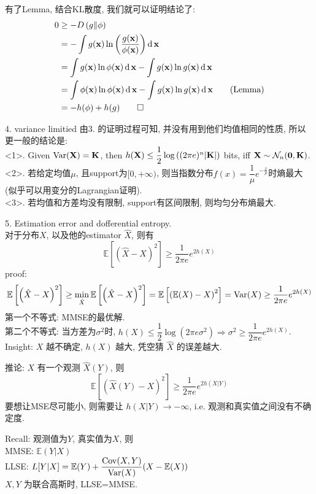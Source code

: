 有了Lemma, 结合KL散度, 我们就可以证明结论了:
\begin{align*}
0 &\geq -D\left(g\|\phi\right) \\
&= -\int g(\mathbf{x})\ln\left(\dfrac{g(\mathbf{x})}{\phi(\mathbf{x})}\right)\operatorname{d}\mathbf{x} \\
&= \int g(\mathbf{x})\ln \phi(\mathbf{x})\operatorname{d}\mathbf{x} - \int g(\mathbf{x})\ln g(\mathbf{x})\operatorname{d}\mathbf{x} \\
&= \int \phi(\mathbf{x})\ln \phi(\mathbf{x})\operatorname{d}\mathbf{x} - \int g(\mathbf{x})\ln g(\mathbf{x})\operatorname{d}\mathbf{x} \qquad \text{(Lemma)} \\
&= -h(\phi) + h(g) \qed
\end{align*}

4. variance limitied
由3. 的证明过程可知, 并没有用到他们均值相同的性质, 所以更一般的结论是: \\
<1>. Given $\operatorname{Var}(\mathbf{X})=\mathbf{K}$, then $h(\mathbf{X}) \leq \dfrac{1}{2}\log\left((2\pi e)^n|\mathbf{K}|\right)$ bits, iff $\mathbf{X}\sim\mathcal{N}_n(\mathbf{0},\mathbf{K})$. \\
<2>. 若给定均值$\mu$, 且support为$[0, +\infty)$, 则当指数分布$f(x)=\dfrac{1}{\mu}e^{-\frac{x}{\mu}}$时熵最大(似乎可以用变分的Lagrangian证明). \\
<3>. 若均值和方差均没有限制, support有区间限制, 则均匀分布熵最大.

5. Estimation error and dofferential entropy. \\
对于分布$X$, 以及他的estimator $\hat{X}$, 则有
$$\mathbb{E}\left[\left(\hat{X}-X\right)^2\right]\geq \dfrac{1}{2\pi e}e^{2h(X)}$$
proof:
$$\mathbb{E}\left[\left(\hat{X}-X\right)^2\right] \geq \min_{\hat{X}}\mathbb{E}\left[\left(\hat{X}-X\right)^2\right] = \mathbb{E}\left[\left(\mathbb{E}(X)-X\right)^2\right]=\operatorname{Var}(X)\geq \dfrac{1}{2\pi e}e^{2h(X)}$$
第一个不等式: MMSE的最优解. \\
第二个不等式: 当方差为$\sigma^2$时, $h(X)\leq \dfrac{1}{2}\log(2\pi e \sigma^2) \Rightarrow \sigma^2\geq \dfrac{1}{2\pi e}e^{2h(X)}$. \\
Insight: $X$ 越不确定, $h(X)$ 越大, 凭空猜 $\hat{X}$ 的误差越大.

推论: $X$ 有一个观测 $\hat{X}(Y)$, 则
$$\mathbb{E}\left[\left(\hat{X}(Y)-X\right)^2\right]\geq \dfrac{1}{2\pi e}e^{2h(X|Y)}$$
要想让MSE尽可能小, 则需要让 $h(X|Y)\to -\infty$, i.e. 观测和真实值之间没有不确定度.

Recall: 观测值为$Y$, 真实值为$X$, 则 \\
MMSE: $\mathbb{E}(Y|X)$ \\
LLSE: $L[Y|X]=\mathbb{E}(Y)+\dfrac{\operatorname{Cov}(X,Y)}{\operatorname{Var}(X)}(X-\mathbb{E}(X))$ \\
$X, Y$ 为联合高斯时, LLSE=MMSE.